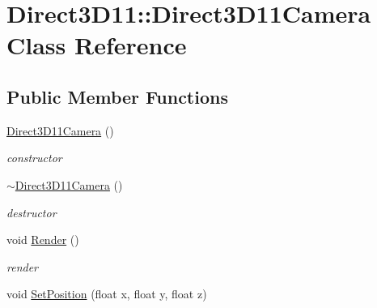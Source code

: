 \hypertarget{class_direct3_d11_1_1_direct3_d11_camera}{}\section{Direct3\+D11\+:\+:Direct3\+D11\+Camera Class Reference}
\label{class_direct3_d11_1_1_direct3_d11_camera}
\subsection*{Public Member Functions}
\begin{DoxyCompactItemize}
\item 
\mbox{\label{class_direct3_d11_1_1_direct3_d11_camera_abb04d9a05f6b807225ff0e956f7bf45b}} 
\mbox{\hyperlink{class_direct3_d11_1_1_direct3_d11_camera_abb04d9a05f6b807225ff0e956f7bf45b}{Direct3\+D11\+Camera}} ()
\begin{DoxyCompactList}\small\item\em constructor \end{DoxyCompactList}\item 
\mbox{\label{class_direct3_d11_1_1_direct3_d11_camera_acd9a3c3d286c34fdf09124b24cdfbb4a}} 
\mbox{\hyperlink{class_direct3_d11_1_1_direct3_d11_camera_acd9a3c3d286c34fdf09124b24cdfbb4a}{$\sim$\+Direct3\+D11\+Camera}} ()
\begin{DoxyCompactList}\small\item\em destructor \end{DoxyCompactList}\item 
\mbox{\label{class_direct3_d11_1_1_direct3_d11_camera_a1123b15f87e4c85cd8f951d10f556146}} 
void \mbox{\hyperlink{class_direct3_d11_1_1_direct3_d11_camera_a1123b15f87e4c85cd8f951d10f556146}{Render}} ()
\begin{DoxyCompactList}\small\item\em render \end{DoxyCompactList}\item 
\mbox{\label{class_direct3_d11_1_1_direct3_d11_camera_a1fa921fbbe4bde1c4a7fa9400a25dee3}} 
void \mbox{\hyperlink{class_direct3_d11_1_1_direct3_d11_camera_a1fa921fbbe4bde1c4a7fa9400a25dee3}{Set\+Position}} (float x, float y, float z)

\end{DoxyCompactItemize}
